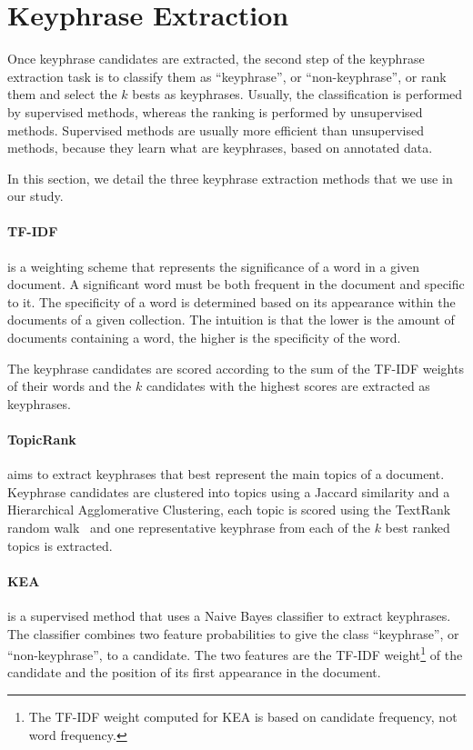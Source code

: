 \section{Keyphrase Extraction}
\label{sec:keyphrase_extraction}
  Once keyphrase candidates are extracted, the second step of the keyphrase
  extraction task is to classify them as ``keyphrase'', or ``non-keyphrase'', or
  rank them and select the $k$ bests as keyphrases. Usually, the classification
  is performed by supervised methods, whereas the ranking is performed by
  unsupervised methods. Supervised methods are usually more efficient than
  unsupervised methods, because they learn what are keyphrases, based on
  annotated data.

  In this section, we detail the three keyphrase extraction methods that we use
  in our study.

  \paragraph{TF-IDF~\textnormal{\cite{jones1972tfidf}}} is a weighting scheme
  that represents the significance of a word in a given document. A significant
  word must be both frequent in the document and specific to it. The specificity
  of a word is determined based on its appearance within the documents of a
  given collection. The intuition is that the lower is the amount of documents
  containing a word, the higher is the specificity of the word.

  The keyphrase candidates are scored according to the sum of the TF-IDF weights
  of their words and the $k$ candidates with the highest scores are extracted as
  keyphrases.

  \paragraph{TopicRank~\textnormal{\cite{bougouin2013topicrank}}} aims to
  extract keyphrases that best represent the main topics of a document.
  Keyphrase candidates are clustered into topics using a Jaccard similarity and
  a Hierarchical Agglomerative Clustering, each topic is scored using the
  TextRank random walk~\cite{mihalcea2004textrank} and one representative
  keyphrase from each of the $k$ best ranked topics is extracted.

  \paragraph{KEA~\textnormal{\cite{witten1999kea}}} is a supervised method that
  uses a Naive Bayes classifier to extract keyphrases. The classifier combines
  two feature probabilities to give the class ``keyphrase'', or
  ``non-keyphrase'', to a candidate. The two features are the TF-IDF
  weight\footnote{The TF-IDF weight computed for KEA is based on candidate
  frequency, not word frequency.} of the candidate and the position of its first
  appearance in the document.

